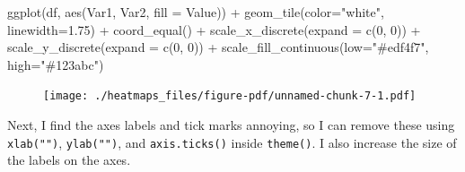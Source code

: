 \documentclass[
  letterpaper,
  DIV=11,
  numbers=noendperiod]{scrreprt}
\newenvironment{Shaded}{\begin{snugshade}}{\end{snugshade}}
\newcommand{\AttributeTok}[1]{\textcolor[rgb]{0.40,0.45,0.13}{#1}}
\newcommand{\DecValTok}[1]{\textcolor[rgb]{0.68,0.00,0.00}{#1}}
\newcommand{\FloatTok}[1]{\textcolor[rgb]{0.68,0.00,0.00}{#1}}
\newcommand{\FunctionTok}[1]{\textcolor[rgb]{0.28,0.35,0.67}{#1}}
\newcommand{\NormalTok}[1]{\textcolor[rgb]{0.00,0.23,0.31}{#1}}
\newcommand{\SpecialCharTok}[1]{\textcolor[rgb]{0.37,0.37,0.37}{#1}}
\newcommand{\StringTok}[1]{\textcolor[rgb]{0.13,0.47,0.30}{#1}}
\begin{document}
\begin{Shaded}
\begin{Highlighting}[]
\FunctionTok{ggplot}\NormalTok{(df, }\FunctionTok{aes}\NormalTok{(Var1, Var2, }\AttributeTok{fill =}\NormalTok{ Value)) }\SpecialCharTok{+} 
  \FunctionTok{geom\_tile}\NormalTok{(}\AttributeTok{color=}\StringTok{"white"}\NormalTok{, }\AttributeTok{linewidth=}\FloatTok{1.75}\NormalTok{) }\SpecialCharTok{+}
  \FunctionTok{coord\_equal}\NormalTok{() }\SpecialCharTok{+}
  \FunctionTok{scale\_x\_discrete}\NormalTok{(}\AttributeTok{expand =} \FunctionTok{c}\NormalTok{(}\DecValTok{0}\NormalTok{, }\DecValTok{0}\NormalTok{)) }\SpecialCharTok{+}
  \FunctionTok{scale\_y\_discrete}\NormalTok{(}\AttributeTok{expand =} \FunctionTok{c}\NormalTok{(}\DecValTok{0}\NormalTok{, }\DecValTok{0}\NormalTok{)) }\SpecialCharTok{+} 
  \FunctionTok{scale\_fill\_continuous}\NormalTok{(}\AttributeTok{low=}\StringTok{"\#edf4f7"}\NormalTok{, }\AttributeTok{high=}\StringTok{"\#123abc"}\NormalTok{)}
\end{Highlighting}
\end{Shaded}

\begin{figure}[H]

{\centering \texttt{[image: ./heatmaps\_files/figure-pdf/unnamed-chunk-7-1.pdf]}

}

\end{figure}

Next, I find the axes labels and tick marks annoying, so I can remove
these using \texttt{xlab("")}, \texttt{ylab("")}, and
\texttt{axis.ticks()} inside \texttt{theme()}. I also increase the size
of the labels on the axes.
\end{document}
